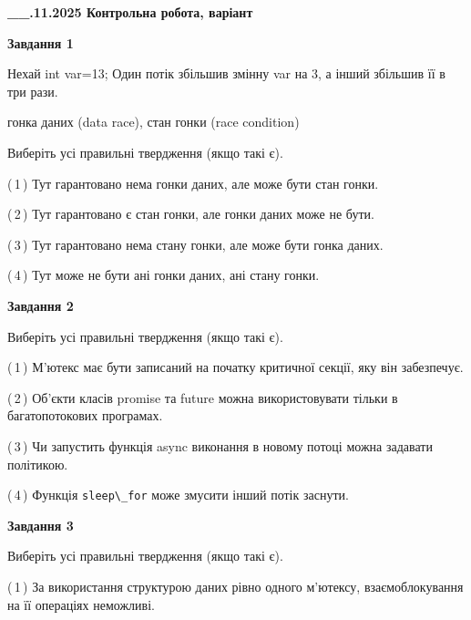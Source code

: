 \documentclass[12pt, ukrainian]{article}
\def\code#1{\Verb!#1!}
\begin{document}
\begin {large}

\textbf{\_\_.11.2025 Контрольна робота, варіант  }\par


{

\begin{center}
\textbf{Завдання 1}
\end{center}
Нехай int var=13; Один потік збільшив змінну var на 3, а інший збільшив її в три рази.

гонка даних (data race), стан гонки (race condition)

Виберіть усі правильні твердження (якщо такі є).\par
\vspace{2mm}
(\,1\,) Тут гарантовано нема гонки даних, але може бути стан гонки.%

(\,2\,) Тут гарантовано є стан гонки, але гонки даних може не бути.%

(\,3\,) Тут гарантовано нема стану гонки, але може бути гонка даних.%

(\,4\,) Тут може не бути ані гонки даних, ані стану гонки.%



\begin{center}
\textbf{Завдання 2}
\end{center}
Виберіть усі правильні твердження (якщо такі є).\par
\vspace{2mm}

(\,1\,) М’ютекс має бути записаний на початку критичної секції, яку він забезпечує.%

(\,2\,) Об’єкти класів promise та future можна використовувати тільки в багатопотокових програмах.%

(\,3\,) Чи запустить функція  async виконання в новому потоці можна задавати політикою.%

(\,4\,) Функція \code{sleep\_for} може змусити інший потік заснути.%



\begin{center}
\textbf{Завдання 3}
\end{center}
Виберіть усі правильні твердження (якщо такі є).\par
\vspace{2mm}

(\,1\,) За використання структурою даних рівно одного м’ютексу, взаємоблокування на її операціях неможливі.%

}
\end{large}
\end{document}
